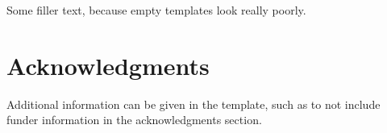 \documentclass[9pt,lineno]{elife}
\begin{document}
Some filler text, because empty templates look really poorly. \lipsum[1]


\section{Acknowledgments}

Additional information can be given in the template, such as to not include funder information in the acknowledgments section.

\nocite{*} %


\end{document}
